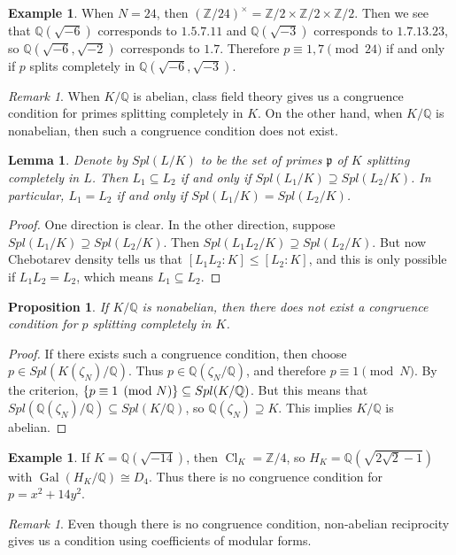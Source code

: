 \documentclass[leqno, openany]{memoir}
\newtheorem{prop}[thm]{Proposition}
\newtheorem{lem}[thm]{Lemma}
\theoremstyle{definition}
\newtheorem{exm}[thm]{Example}
\theoremstyle{remark}
\newtheorem{rmk}[thm]{Remark}
\theoremstyle{plain}
\theoremstyle{definition}
\theoremstyle{remark}
\newcommand{\Z}{\mathbb{Z}}
\newcommand{\Q}{\mathbb{Q}}
\newcommand{\mf}[1]{\mathfrak{#1}}
\DeclareMathOperator{\Gal}{Gal}
\DeclareMathOperator{\Cl}{Cl}
\begin{document}
\begin{exm} When $N = 24$, then ${(\Z/24)}^{\times} = \Z/2 \times \Z/2 \times
    \Z/2$. Then we see that $\Q(\sqrt{-6})$ corresponds to $\qty{1,5,7,11}$ and
    $\Q(\sqrt{-3})$ corresponds to $\qty{1,7,13,23}$, so $\Q(\sqrt{-6},
    \sqrt{-2})$ corresponds to $\qty{1,7}$. Therefore $p \equiv 1,7 \pmod{24}$
    if and only if $p$ splits completely in $\Q(\sqrt{-6}, \sqrt{-3})$.
\end{exm}

\begin{rmk} When $K/\Q$ is abelian, class field theory gives us a congruence
condition for primes splitting completely in $K$. On the other hand, when
$K/\Q$ is nonabelian, then such a congruence condition does not exist.
\end{rmk}

\begin{lem} Denote by $Spl(L/K)$ to be the set of primes $\mf{p}$ of $K$
    splitting completely in $L$. Then $L_1 \subseteq L_2$ if and only if
    $Spl(L_1/K) \supseteq Spl(L_2/K)$. In particular, $L_1 = L_2$ if and only
    if $Spl(L_1/K) = Spl(L_2/K)$.  \end{lem}

\begin{proof} One direction is clear. In the other direction, suppose
    $Spl(L_1/K) \supseteq Spl(L_2/K)$. Then $Spl(L_1 L_2/K) \supseteq
    Spl(L_2/K)$. But now Chebotarev density tells us that $[L_1 L_2:K] \leq
    [L_2:K]$, and this is only possible if $L_1 L_2 = L_2$, which means $L_1
    \subseteq L_2$.  \end{proof}

\begin{prop} If $K/\Q$ is nonabelian, then there does not exist a congruence
condition for $p$ splitting completely in $K$.  \end{prop}

\begin{proof} If there exists such a congruence condition, then choose $p \in
    Spl(K(\zeta_N)/\Q)$. Thus $p \in \Q(\zeta_N/\Q)$, and therefore $p \equiv 1
    \pmod N$. By the criterion, $\qty{p \equiv 1 \pmod N} \subseteq Spl(K/\Q)$.
    But this means that $Spl(\Q(\zeta_N)/\Q) \subseteq Spl(K/\Q)$, so
    $\Q(\zeta_N) \supseteq K$. This implies $K/\Q$ is abelian.  \end{proof}

\begin{exm} If $K = \Q(\sqrt{-14})$, then $\Cl_K = \Z/4$, so $H_K = \Q(\sqrt{2
\sqrt{2}-1})$ with $\Gal(H_K/\Q) \cong D_4$. Thus there is no congruence
condition for $p = x^2 + 14y^2$.  \end{exm}

\begin{rmk} Even though there is no congruence condition, non-abelian
reciprocity gives us a condition using coefficients of modular forms.
\end{rmk}
\end{document}
